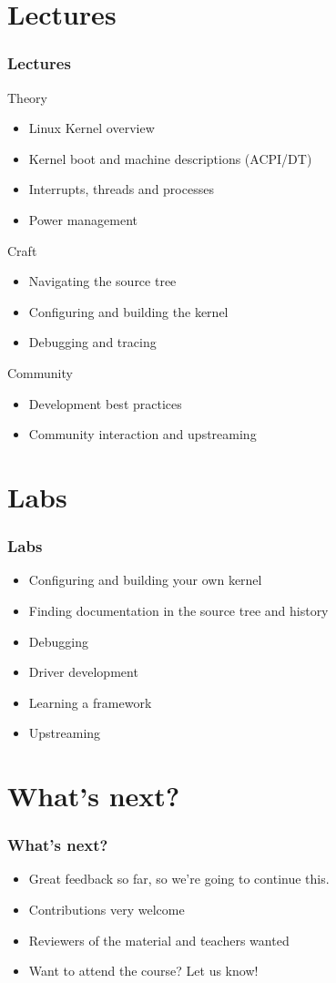\documentclass{beamer}
\begin{document}
\section{Lectures}
\begin{frame}
\frametitle{Lectures}
Theory 
\begin{itemize}
	\item Linux Kernel overview 
	\item Kernel boot and machine descriptions (ACPI/DT)
	\item Interrupts, threads and processes
	\item Power management
\end{itemize}
Craft
\begin{itemize}
	\item Navigating the source tree
	\item Configuring and building the kernel
	\item Debugging and tracing
\end{itemize}
Community
\begin{itemize}
	\item Development best practices
	\item Community interaction and upstreaming
\end{itemize}
\end{frame}

\section{Labs}
\begin{frame}
\frametitle{Labs}
\begin{itemize}
	\item Configuring and building your own kernel
	\item Finding documentation in the source tree and history
	\item Debugging
	\item Driver development
	\item Learning a framework
	\item Upstreaming
\end{itemize}
\end{frame}

\section{What's next?}
\begin{frame}
\frametitle{What's next?}
\begin{itemize}
	\item Great feedback so far, so we're going to continue this.
	\item Contributions very welcome
	\item Reviewers of the material and teachers wanted
	\item Want to attend the course? Let us know!
\end{itemize} 
\end{frame}
\end{document}
